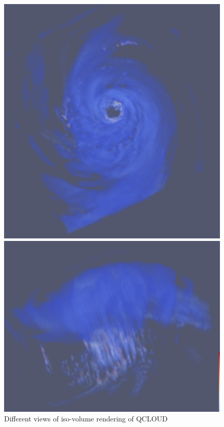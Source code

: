 \documentclass[a4paper,11pt]{article}
\theoremstyle{mytheor}
\begin{document}
\begin{figure}[!h]
    \centering
    \includegraphics[scale=0.8]{Figures/P1_4_1.PNG}
    
    \vspace{0.5 cm}
    \includegraphics[scale=0.8]{Figures/P1_4_2.PNG}
    \caption{Different views of iso-volume rendering of QCLOUD}
    \label{p1_4}
\end{figure}
\clearpage
\end{document}
